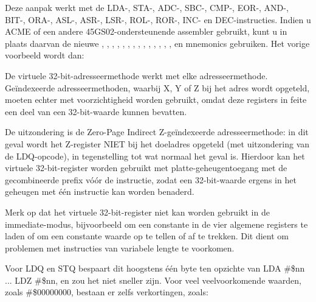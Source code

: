 Deze aanpak werkt met de LDA-, STA-, ADC-, SBC-, CMP-, EOR-, AND-, BIT-, ORA-, ASL-, ASR-, LSR-, ROL-, ROR-, INC- en DEC-instructies. Indien u ACME of een andere 45GS02-ondersteunende assembler gebruikt, kunt u in plaats daarvan de nieuwe , , , , , , , , , , , , , ,  en  mnemonics gebruiken. Het vorige voorbeeld wordt dan:


De virtuele 32-bit-adresseermethode werkt met elke adresseermethode. Geïndexeerde adresseermethoden, waarbij X, Y of Z bij het adres wordt opgeteld, moeten echter met voorzichtigheid worden gebruikt, omdat deze registers in feite een deel van een 32-bit-waarde kunnen bevatten.

De uitzondering is de Zero-Page Indirect Z-geïndexeerde adresseermethode: in dit geval wordt het Z-register NIET bij het doeladres opgeteld (met uitzondering van de LDQ-opcode), in tegenstelling tot wat normaal het geval is. Hierdoor kan het virtuele 32-bit-register worden gebruikt met platte-geheugentoegang met de gecombineerde prefix  vóór de instructie, zodat een 32-bit-waarde ergens in het geheugen met één instructie kan worden benaderd.

Merk op dat het virtuele 32-bit-register niet kan worden gebruikt in de immediate-modus, bijvoorbeeld om een constante in de vier algemene registers te laden of om een constante waarde op te tellen of af te trekken. Dit dient om problemen met instructies van variabele lengte te voorkomen.

Voor LDQ en STQ bespaart dit hoogstens één byte ten opzichte van LDA \#\$nn ... LDZ \#\$nn, en zou het niet sneller zijn. Voor veel veelvoorkomende waarden, zoals \#\$00000000, bestaan er zelfs verkortingen, zoals:

